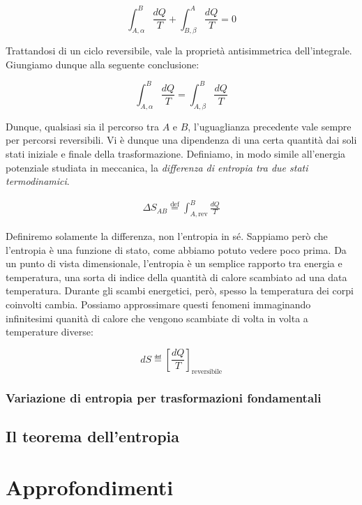 \[ \int_{A,\alpha}^{B} \frac{dQ}{T} + \int_{B,\beta}^{A} \frac{dQ}{T} = 0 \]

\noindent Trattandosi di un ciclo reversibile, vale la proprietà antisimmetrica
dell'integrale. Giungiamo dunque alla seguente conclusione:

\[ \int_{A,\alpha}^{B} \frac{dQ}{T} = \int_{A,\beta}^{B} \frac{dQ}{T} \]

\noindent Dunque, qualsiasi sia il percorso tra $A$ e $B$, l'uguaglianza
precedente vale sempre per percorsi reversibili. Vi è dunque una dipendenza
di una certa quantità dai soli stati iniziale e finale della trasformazione.
Definiamo, in modo simile all'energia potenziale studiata in meccanica,
la \textit{differenza di entropia tra due stati termodinamici}.

\begin{align}
    \Delta S_{AB} \stackrel{\text{def}}{=} \int_{A,\text{rev}}^{B} \frac{dQ}{T}
\end{align}

\noindent Definiremo solamente la differenza, non l'entropia in sé.
Sappiamo però che l'entropia è una funzione di stato, come abbiamo
potuto vedere poco prima. Da un punto di vista dimensionale, l'entropia
è un semplice rapporto tra energia e temperatura, una sorta di
indice della quantità di calore scambiato ad una data temperatura.
Durante gli scambi energetici, però, spesso la temperatura dei corpi
coinvolti cambia. Possiamo approssimare questi fenomeni immaginando
infinitesimi quanità di calore che vengono scambiate di volta in volta
a temperature diverse:

\[ dS \eqdef \left[\frac{dQ}{T}\right]_\text{reversibile} \]

\subsubsection*{Variazione di entropia per trasformazioni fondamentali}



\subsection{Il teorema dell'entropia}









\section{Approfondimenti}

